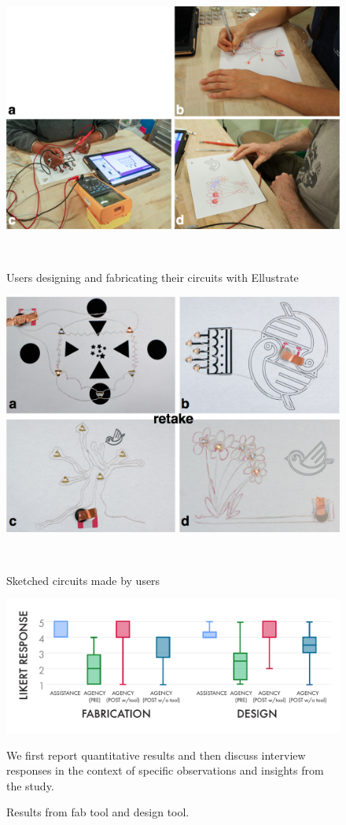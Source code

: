 \documentclass{sigchi}
\begin{document}
\begin{figure}
\centering
  \includegraphics[width=1\columnwidth]{figures/Users_in_action}
  \caption{Users designing and fabricating their circuits with Ellustrate}~\label{fig:users-in-action}
\end{figure}


\begin{figure}
\centering
  \includegraphics[width=1\columnwidth]{figures/Users_artwork}
  \caption{Sketched circuits made by users}~\label{fig:user-artwork}
\end{figure}




\begin{figure}[t]
\centering
\includegraphics[width=1.0\columnwidth]{charts/boxplots_quant.pdf}
\caption{Results from fab tool and design tool. }
We first report quantitative results and then discuss interview responses in the context of specific observations and insights from the study.
\label{fig:fab_tool_results}
\end{figure}
\end{document}
